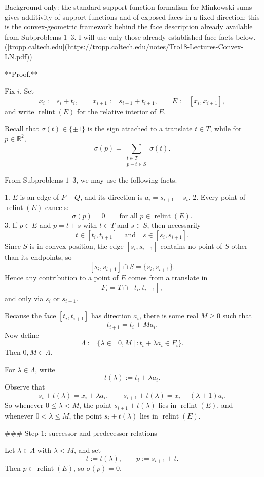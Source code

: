 Background only: the standard support-function formalism for Minkowski sums gives additivity of support functions and of exposed faces in a fixed direction; this is the convex-geometric framework behind the face description already available from Subproblems \(1\)–\(3\). I will use only those already-established face facts below. ([tropp.caltech.edu](https://tropp.caltech.edu/notes/Tro18-Lectures-Convex-LN.pdf))

**Proof.**

Fix \(i\). Set
\[
x_i:=s_i+t_i,\qquad x_{i+1}:=s_{i+1}+t_{i+1},\qquad E:=[x_i,x_{i+1}],
\]
and write \(\operatorname{relint}(E)\) for the relative interior of \(E\).

Recall that \(\sigma(t)\in\{\pm1\}\) is the sign attached to a translate \(t\in T\), while for \(p\in\mathbb{R}^2\),
\[
\sigma(p)=\sum_{\substack{t\in T\\ p-t\in S}}\sigma(t).
\]

From Subproblems \(1\)–\(3\), we may use the following facts.

1. \(E\) is an edge of \(P+Q\), and its direction is \(a_i=s_{i+1}-s_i\).
2. Every point of \(\operatorname{relint}(E)\) cancels:
   \[
   \sigma(p)=0\qquad\text{for all }p\in \operatorname{relint}(E).
   \]
3. If \(p\in E\) and \(p=t+s\) with \(t\in T\) and \(s\in S\), then necessarily
   \[
   t\in [t_i,t_{i+1}]
   \quad\text{and}\quad
   s\in [s_i,s_{i+1}].
   \]
   Since \(S\) is in convex position, the edge \([s_i,s_{i+1}]\) contains no point of \(S\) other than its endpoints, so
   \[
   [s_i,s_{i+1}]\cap S=\{s_i,s_{i+1}\}.
   \]
   Hence any contribution to a point of \(E\) comes from a translate in
   \[
   F_i=T\cap [t_i,t_{i+1}],
   \]
   and only via \(s_i\) or \(s_{i+1}\).

Because the face \([t_i,t_{i+1}]\) has direction \(a_i\), there is some real \(M\ge 0\) such that
\[
t_{i+1}=t_i+M a_i.
\]
Now define
\[
\Lambda:=\{\lambda\in[0,M]: t_i+\lambda a_i\in F_i\}.
\]
Then \(0,M\in\Lambda\).

For \(\lambda\in\Lambda\), write
\[
t(\lambda):=t_i+\lambda a_i.
\]
Observe that
\[
s_i+t(\lambda)=x_i+\lambda a_i,\qquad
s_{i+1}+t(\lambda)=x_i+(\lambda+1)a_i.
\]
So whenever \(0\le \lambda<M\), the point \(s_{i+1}+t(\lambda)\) lies in \(\operatorname{relint}(E)\), and whenever \(0<\lambda\le M\), the point \(s_i+t(\lambda)\) lies in \(\operatorname{relint}(E)\).

### Step \(1\): successor and predecessor relations

Let \(\lambda\in\Lambda\) with \(\lambda<M\), and set
\[
t:=t(\lambda),\qquad p:=s_{i+1}+t.
\]
Then \(p\in \operatorname{relint}(E)\), so \(\sigma(p)=0\).

